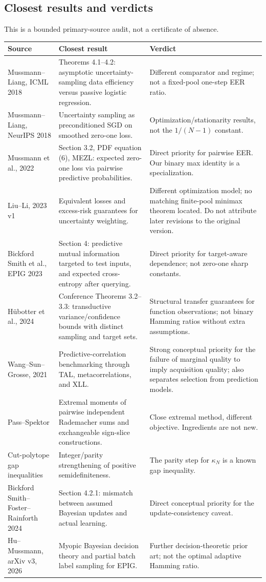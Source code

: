 \documentclass[11pt]{article}
\theoremstyle{definition}
\newcommand{\1}{\mathbf 1}
\begin{document}
\subsection{Closest results and verdicts}
This is a bounded primary-source audit, not a certificate of absence.
\small
\begin{longtable}{p{}p{}p{}}
\toprule Source & Closest result & Verdict\\\midrule\endhead
Mussmann--Liang, ICML 2018 \cite{ml18icml}&
Theorems 4.1--4.2: asymptotic uncertainty-sampling data efficiency versus
passive logistic regression.&
Different comparator and regime; not a fixed-pool one-step EER ratio.\\
Mussmann--Liang, NeurIPS 2018 \cite{ml18nips}&
Uncertainty sampling as preconditioned SGD on smoothed zero-one loss.&
Optimization/stationarity results, not the $1/(N-1)$ constant.\\
Mussmann et al., 2022 \cite{eer}&
Section 3.2, PDF equation (6), MEZL: expected zero-one loss via pairwise
predictive probabilities.&
Direct priority for pairwise EER. Our binary max identity is a specialization.\\
Liu--Li, 2023 v1 \cite{liu}&
Equivalent losses and excess-risk guarantees for uncertainty weighting.&
Different optimization model; no matching finite-pool minimax theorem located.
Do not attribute later revisions to the original version.\\
Bickford Smith et al., EPIG 2023 \cite{epig}&
Section 4: predictive mutual information targeted to test inputs, and expected
cross-entropy after querying.&
Direct priority for target-aware dependence; not zero-one sharp constants.\\
H\"ubotter et al., 2024 \cite{tal}&
Conference Theorems 3.2--3.3: transductive variance/confidence bounds with
distinct sampling and target sets.&
Structural transfer guarantees for function observations; not binary
Hamming ratios without extra assumptions.\\
Wang--Sun--Grosse, 2021 \cite{wang}&
Predictive-correlation benchmarking through TAL, metacorrelations, and XLL.&
Strong conceptual priority for the failure of marginal quality to imply
acquisition quality; also separates selection from prediction models.\\
Pass--Spektor \cite{pass}&
Extremal moments of pairwise independent Rademacher sums and exchangeable
sign-slice constructions.&
Close extremal method, different objective. Ingredients are not new.\\
Cut-polytope gap inequalities \cite{gap}&
Integer/parity strengthening of positive semidefiniteness.&
The parity step for $\kappa_N$ is a known gap inequality.\\
Bickford Smith--Foster--Rainforth 2024 \cite{update}&
Section 4.2.1: mismatch between assumed Bayesian updates and actual learning.&
Direct conceptual priority for the update-consistency caveat.\\
Hu--Mussmann, arXiv v3, 2026 \cite{batch}&
Myopic Bayesian decision theory and partial batch label sampling for EPIG.&
Further decision-theoretic prior art; not the optimal adaptive Hamming ratio.\\
\bottomrule
\end{longtable}
\end{document}
